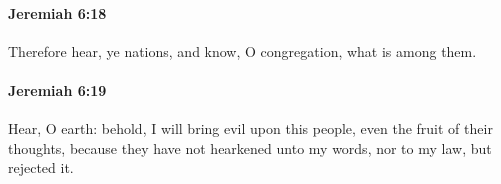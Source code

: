 		\paragraph{Jeremiah 6:18} %
			\label{JEREMIAH-6-18}

			Therefore hear, ye nations, and know, O congregation, what is among them.


		\paragraph{Jeremiah 6:19} %
			\label{JEREMIAH-6-19}

			Hear, O earth: behold, I will bring evil upon this people, even the fruit of their thoughts, because they have not hearkened unto my words, nor to my law, but rejected it.


